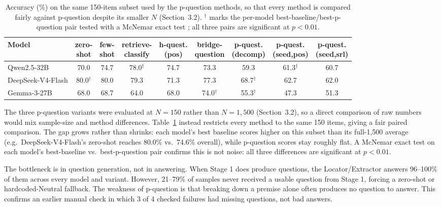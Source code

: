 \documentclass[11pt]{article}
\begin{document}
\begin{table}[t]
\centering
\small
\renewcommand{\arraystretch}{0.92}
\setlength{\tabcolsep}{3.5pt}
\begin{tabular}{lccccc|ccc}
\toprule
Model & \makecell{zero-\\shot} & \makecell{few-\\shot} & \makecell{retrieve-\\classify} & \makecell{h-quest.\\(pos)} & \makecell{bridge-\\question} & \makecell{p-quest.\\(decomp)} & \makecell{p-quest.\\(seed,pos)} & \makecell{p-quest.\\(seed,srl)} \\
\midrule
Qwen2.5-32B       & 70.0 & 74.7 & 78.0$^\dagger$ & 74.7 & 73.3 & 59.3 & 61.3$^\dagger$ & 60.7 \\
DeepSeek-V4-Flash & 80.0$^\dagger$ & 80.0 & 79.3 & 71.3 & 77.3 & 68.7$^\dagger$ & 62.7 & 62.0 \\
Gemma-3-27B       & 68.0 & 68.7 & 64.0 & 68.0 & 74.0$^\dagger$ & 55.3$^\dagger$ & 47.3 & 51.3 \\
\bottomrule
\end{tabular}
\caption{Accuracy (\%) on the same 150-item subset used by the p-question
methods, so that every method is compared fairly against p-question despite
its smaller $N$ (Section~3.2). $^\dagger$ marks the per-model
best-baseline/best-p-question pair tested with a McNemar exact test
\citep{dror-etal-2018-hitchhikers}; all three pairs are significant at
$p<0.01$.}
\label{tab:pq-fair}
\end{table}

The three p-question variants were evaluated at $N=150$ rather than
$N=1{,}500$ (Section~3.2), so a direct comparison of raw numbers would mix
sample-size and method differences. Table~\ref{tab:pq-fair} instead
restricts every method to the same 150 items, giving a fair paired
comparison. The gap grows rather than shrinks: each model's best baseline
scores higher on this subset than its full-1,500 average (e.g.\
DeepSeek-V4-Flash's zero-shot reaches 80.0\% vs.\ 74.6\% overall), while
p-question scores stay roughly flat. A McNemar exact test
\citep{dror-etal-2018-hitchhikers} on each model's best-baseline vs.\
best-p-question pair confirms this is not noise: all three differences are
significant at $p<0.01$.

The bottleneck is in question generation, not in answering. When Stage 1
does produce questions, the Locator/Extractor answers 96--100\% of them
across every model and variant. However, 21--79\% of samples never received
a usable question from Stage 1, forcing a zero-shot or hardcoded-Neutral
fallback. The weakness of p-question is that breaking down a premise alone
often produces no question to answer. This confirms an earlier manual check
in which 3 of 4 checked failures had missing questions, not bad answers.
\end{document}

